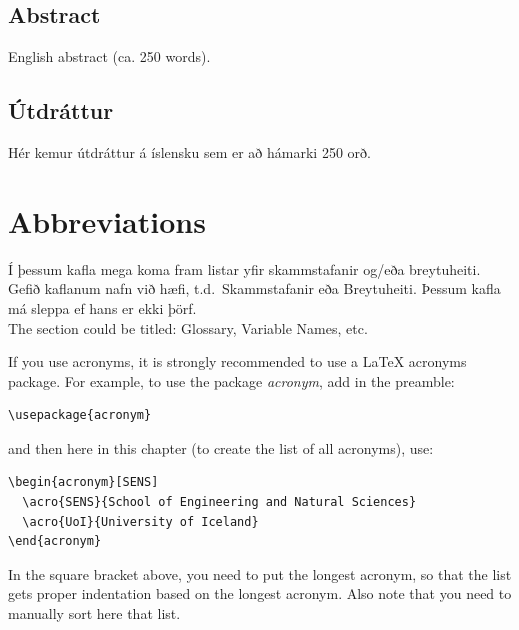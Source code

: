\documentclass[a4paper,12pt,twoside,BCOR=10mm]{scrbook}
\begin{document}
\cleardoublepage


\setcounter{page}{5}

\section*{Abstract}
English abstract (ca. 250 words).

\vfill \vspace*{1cm}

\section*{Útdráttur}
Hér kemur útdráttur á íslensku sem er að hámarki 250 orð.
\vfill

\newpage %
\hypersetup{pageanchor=true}
\tableofcontents
\listoffigures
\listoftables

\chapter*{Abbreviations}

Í þessum kafla mega koma fram listar yfir skammstafanir og/eða breytuheiti. Gefið kaflanum nafn við hæfi, t.d.\ Skammstafanir eða Breytuheiti. Þessum kafla má sleppa ef hans er ekki þörf. \\

The section could be titled: Glossary, Variable Names, etc.

If you use acronyms, it is strongly recommended to use a LaTeX
acronyms package. For example, to use the package \emph{acronym}, add
in the preamble:
\begin{verbatim}
\usepackage{acronym}
\end{verbatim}
and then here in this chapter (to create the list of all acronyms), use:
\begin{verbatim}
\begin{acronym}[SENS]
  \acro{SENS}{School of Engineering and Natural Sciences}
  \acro{UoI}{University of Iceland}
\end{acronym}
\end{verbatim}
In the square bracket above, you need to put the longest acronym, so
that the list gets proper indentation based on the longest acronym.
Also note that you need to manually sort here that list.
\end{document}
